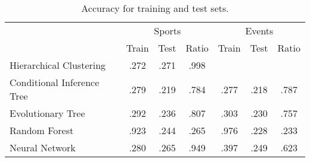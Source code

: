 \begin{table}[h!]
\caption{Accuracy for training and test sets.}
\label{accuracy}
\begin{center}
    \begin{tabular}{lcccccc}
      \multicolumn{1}{c}{} & \multicolumn{3}{c}{Sports} & \multicolumn{3}{c}{Events} \\
       \multicolumn{1}{c}{} & \multicolumn{1}{c}{Train} & \multicolumn{1}{c}{Test} & \multicolumn{1}{c}{Ratio} & \multicolumn{1}{c}{Train} & \multicolumn{1}{c}{Test} & \multicolumn{1}{c}{Ratio}\\
      \midrule
      Hierarchical Clustering     & .272 & .271 & .998 \\
      Conditional Inference Tree  & .279 & .219 & .784 & .277 & .218 & .787 \\
      Evolutionary Tree           & .292 & .236 & .807 & .303 & .230 & .757 \\
      Random Forest               & .923 & .244 & .265 & .976 & .228 & .233 \\
      Neural Network              & .280 & .265 & .949 & .397 & .249 & .623
    \end{tabular}
  \end{center}
\end{table}